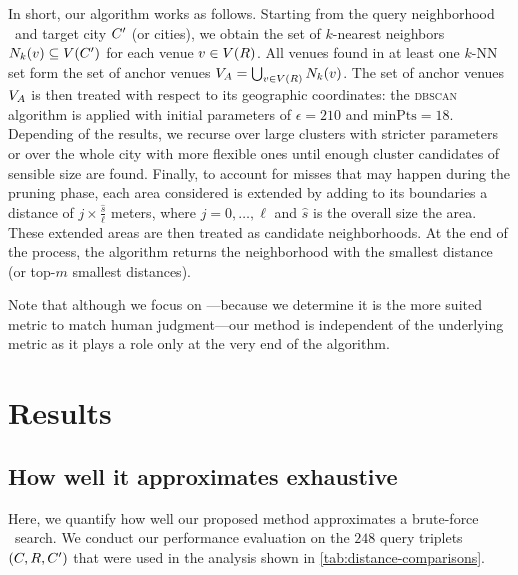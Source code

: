 In short, our algorithm works as follows. 
Starting from the query neighborhood \region\ and target city ${C}'$
(or cities), 
we obtain the set of $k$-nearest neighbors
${N}_k({v})\subseteq{V}({C}')$
for each venue ${v}\in{V}({R})$.
All venues found in at least one $k$-NN set form the set of anchor
venues 
${V}_A=\bigcup_{{v}\in{V}({R})}{N}_k({v})$.
The set of anchor venues ${V}_A$ is then treated with respect to its
geographic coordinates: the \textsc{dbscan} algorithm is applied with initial
parameters of $\epsilon=210$ and $\mathrm{minPts}=18$.
Depending of the results, we recurse over large clusters with
stricter parameters or over the whole city with more flexible ones until enough
cluster candidates of sensible size are found.
Finally, to account for misses that may happen during the pruning phase, each
area considered is extended by adding to its boundaries a distance of $j\times
\frac{\hat{s}}{\ell}$ meters, where $j=0,\ldots,\ell$ and $\hat{s}$ is the
overall size the area. These extended areas are then treated as candidate
neighborhoods. At the end of the process, the algorithm returns the
neighborhood with the smallest distance (or top-$m$ smallest distances).

Note that although we focus on \emd{}---because we determine it is the more
suited metric to match human judgment---our method is independent of the
underlying metric as it plays a role only at the very end of the algorithm.

\section{Results}
\label{sec:app-result}
\subsection{How well it approximates exhaustive \emd{}}


Here, we quantify how well our proposed method
approximates a brute-force \emd\ search. 
We conduct our performance evaluation on the $248$ query
triplets $({C}, {R}, {C}')$ that were used in the analysis
shown in \autoref{tab:distance-comparisons}.


